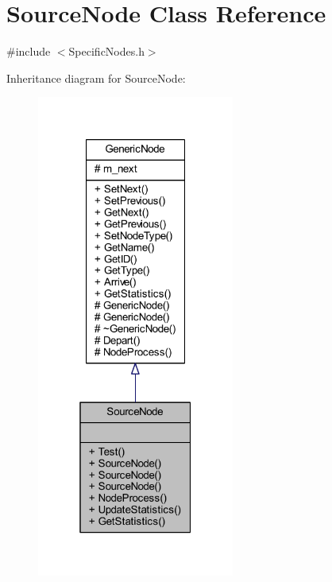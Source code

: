 \hypertarget{class_source_node}{}\section{Source\+Node Class Reference}
\label{class_source_node}


{\ttfamily \#include $<$Specific\+Nodes.\+h$>$}



Inheritance diagram for Source\+Node\+:
\nopagebreak
\begin{figure}[H]
\begin{center}
\leavevmode
\includegraphics[width=184pt]{class_source_node__inherit__graph}
\end{center}
\end{figure}


